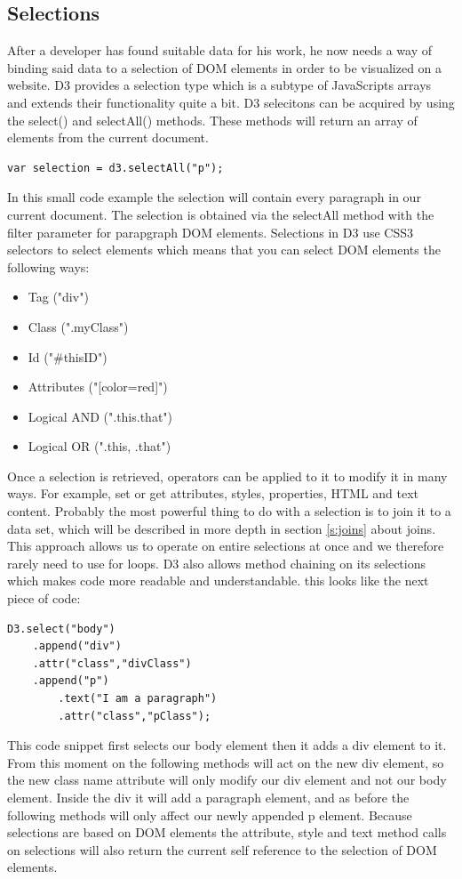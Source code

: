 \documentclass{bioinfo}
\begin{document}
\subsection{Selections}
After a developer has found suitable data for his work, he now needs a way of binding said data to a selection of DOM elements in order to be visualized on a website. 
D3 provides a selection type which is a subtype of JavaScripts arrays and extends their functionality quite a bit. 
D3 selecitons can be acquired by using the select() and selectAll() methods. These methods will return an array of elements from the current document.
\begin{lstlisting}
var selection = d3.selectAll("p");
\end{lstlisting}
In this small code example the selection will contain every paragraph in our current document. The selection is obtained via the selectAll method with the filter parameter for parapgraph DOM elements.
Selections in D3 use CSS3 selectors to select elements which means that you can select DOM elements the following ways:
\begin{itemize}
\item Tag ("div")
\item Class (".myClass")
\item Id ("\#thisID")
\item Attributes ("[color=red]")
\item Logical AND (".this.that")
\item Logical OR (".this, .that")
\end{itemize}
Once a selection is retrieved, operators can be applied to it to modify it in many ways. For example, set or get attributes, styles, properties, HTML and text content. Probably the most powerful thing to do with a selection is to join it to a data set, which will be described in more depth in section \ref{s:joins} about joins.
This approach allows us to operate on entire selections at once and we therefore rarely need to use for loops. D3 also allows method chaining on its selections which makes code more readable and understandable. this looks like the next piece of code:
\begin{lstlisting}
D3.select("body")
	.append("div")
	.attr("class","divClass")
	.append("p")
		.text("I am a paragraph")
		.attr("class","pClass");
\end{lstlisting}
This code snippet first selects our body element then it adds a div element to it. From this moment on the following methods will act on the new div element, so the new class name attribute will only modify our div element and not our body element. Inside the div it will add a paragraph element, and as before the following methods will only affect our newly appended p element. 
Because selections are based on DOM elements the attribute, style and text method calls on selections will also return the current self reference to the selection of DOM elements.
\end{document}
